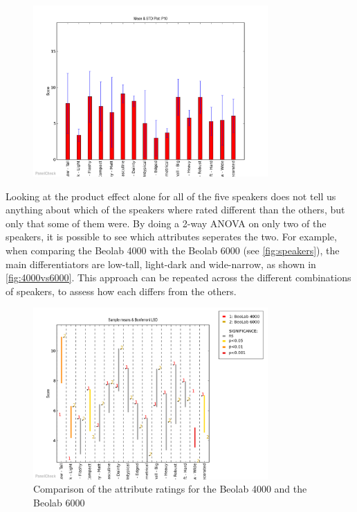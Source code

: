 \begin{figure}[H]
\centering
\includegraphics[width = 0.8\textwidth]{Figure/AttributeImportance.png} 
\caption{}
\label{fig:AttributeImportance}
\end{figure}

Looking at the product effect alone for all of the five speakers does not tell us anything about which of the speakers where rated different than the others, but only that some of them were. By doing a 2-way ANOVA on only two of the speakers, it is possible to see which attributes seperates the two. For example, when comparing the Beolab 4000 with the Beolab 6000 (see \autoref{fig:speakers}), the main differentiators are low-tall, light-dark and wide-narrow, as shown in \autoref{fig:4000vs6000}. This approach can be repeated across the different combinations of speakers, to assess how each differs from the others.

\begin{figure}[H]
\centering
\includegraphics[width = 0.8\textwidth]{Figure/4000vs6000.png} 
\caption{Comparison of the attribute ratings for the Beolab 4000 and the Beolab 6000}
\label{fig:4000vs6000}
\end{figure}



